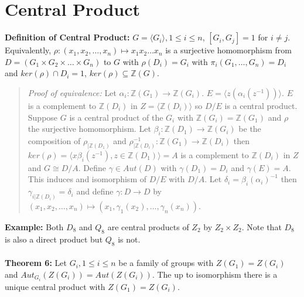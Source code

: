 \section {Central Product}
{\bf Definition of Central Product:}
$G= \langle G_i \rangle , 1 \le i \le n$, $[G_i , G_j ]=1$ for $i \ne j$.  Equivalently,
$\rho: (x_1, x_2, \ldots , x_n) \mapsto x_1 x_2 \ldots x_n$ is a surjective homomorphism
from $D= (G_1 \times G_2 \times \ldots \times G_n)$ to $G$ with $\rho(D_i) = G_i$ with
$\pi_i (G_1, \ldots , G_n)= D_i$ and $ker(\rho) \cap D_i = 1$, $ker(\rho) \subseteq {\mathbb Z}(G)$.
\begin{quote}
\emph{Proof of equivalence:}
Let $\alpha_i: {\mathbb Z}(G_1) \rightarrow {\mathbb Z}(G_i)$.
$E= \langle z(\alpha_i(z^{-1})) \rangle $.  $E$ is a complement to ${\mathbb Z}(D_i )$ in
$Z= \langle {\mathbb Z}(D_i) \rangle $ so $D/E$ is a central product.  Suppose $G$ is a
central product of the $G_i$ with ${\mathbb Z}(G_i)={\mathbb Z}(G_1)$ and $\rho$ the surjective
homomorphism.  Let $\beta_i:{\mathbb Z}(D_1) \rightarrow {\mathbb Z}(G_i)$ be the composition of
$\rho_{|{\mathbb Z}(D_1)}$ and
$\rho_{|{\mathbb Z}(D_i)}^{-1}: {\mathbb Z}(G_1) \rightarrow {\mathbb Z}(D_i)$ then
$ker(\rho)= \langle x \beta_i(z^{-1}), z \in {\mathbb Z}(D_1) \rangle = A$ is a complement
to ${\mathbb Z}(D_i)$ in $Z$ and $G \cong D/A$.  Define $\gamma \in Aut(D)$ with $\gamma(D_1)=D_i$
and $\gamma(E)=A$.  This induces and isomorphism of $D/E$ with $D/A$.  Let
$\delta_i= \beta_i (\alpha_i)^{-1}$ then $\gamma_{i|{\mathbb Z}(D_i)}= \delta_i$ and
define $\gamma: D \rightarrow D$ by $(x_1, x_2 , \ldots , x_n) \mapsto (x_1, \gamma_1(x_2), \ldots,
\gamma_n(x_n))$.
\end{quote}
{\bf Example:}
Both $D_8$ and
$Q_8$ are central products of $Z_2$ by $Z_2 \times Z_2$.  Note that $D_8$ is also a direct product but $Q_8$
is not.
\\
\\
{\bf Theorem 6:}
Let $G_i, 1 \le i \le n$ be a family of groups with $Z(G_1)=Z(G_i)$ and
$Aut_{G_i}(Z(G_i))=Aut(Z(G_i))$.  The up to isomorphism there is a unique
central product with $Z(G_1)=Z(G_i)$.
